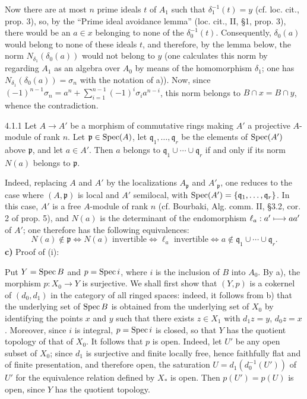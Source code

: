 Now there are at most $n$ prime ideals $t$ of $A_1$ such that $\delta_1^{-1}(t)=y$ (cf. loc. cit., prop. 3), so, by the ``Prime ideal avoidance lemma'' (loc. cit., II, §1, prop. 3), there would be an $a\in x$ belonging to none of the $\delta_0^{-1}(t)$. Consequently, $\delta_0(a)$ would belong to none of these ideals $t$, and therefore, by the lemma below, the norm $N_{\delta_1}(\delta_0(a))$ would not belong to $y$ (one calculates this norm by regarding $A_1$ as an algebra over $A_0$ by means of the homomorphism $\delta_1$; one has $N_{\delta_1}(\delta_0(a))=\sigma_n$ with the notation of a)). Now, since $(-1)^{n-1}\sigma_n=a^n+\sum_{i=1}^{n-1}(-1)^i\sigma_i a^{n-i}$, this norm belongs to $B\cap x=B\cap y$, whence the contradiction.
\begin{lemma}{4.1.1}\label{V.4.1.1}
Let $A\to A'$ be a morphism of commutative rings making $A'$ a projective $A$-module of rank $n$. Let $\mathfrak p\in\operatorname{Spec}(A)$, let $\mathfrak q_1,\ldots,\mathfrak q_r$ be the elements of $\operatorname{Spec}(A')$ above $\mathfrak p$, and let $a\in A'$. Then $a$ belongs to $\mathfrak q_1\cup\cdots\cup\mathfrak q_r$ if and only if its norm $N(a)$ belongs to $\mathfrak p$.
\end{lemma}
Indeed, replacing $A$ and $A'$ by the localizations $A_{\mathfrak p}$ and $A'_{\mathfrak p}$, one reduces to the case where $(A,\mathfrak p)$ is local and $A'$ semilocal, with $\operatorname{Spec}(A')=\{\mathfrak q_1,\ldots,\mathfrak q_r\}$.
In this case, $A'$ is a free $A$-module of rank $n$ (cf. Bourbaki, Alg. comm. II, §3.2, cor. 2 of prop. 5), and $N(a)$ is the determinant of the endomorphism $\ell_a:a'\longmapsto aa'$ of $A'$; one therefore has the following equivalences:
\[
N(a)\notin\mathfrak p\iff N(a)\text{ invertible}\iff\ell_a\text{ invertible}\iff a\notin\mathfrak q_1\cup\cdots\cup\mathfrak q_r.
\]
\textbf{c)} Proof of (i):

Put $Y=\operatorname{Spec} B$ and $p=\operatorname{Spec} i$, where $i$ is the inclusion of $B$ into $A_0$. By a), the morphism $p:X_0\to Y$ is surjective. We shall first show that $(Y,p)$ is a cokernel of $(d_0,d_1)$ in the category of all ringed spaces: indeed, it follows from b) that the underlying set of $\operatorname{Spec} B$ is obtained from the underlying set of $X_0$ by identifying the points $x$ and $y$ such that there exists $z\in X_1$ with $d_1z=y$, $d_0z=x$. Moreover, since $i$ is integral, $p=\operatorname{Spec} i$ is closed, so that $Y$ has the quotient topology of that of $X_0$. It follows that $p$ is open. Indeed, let $U'$ be any open subset of $X_0$; since $d_1$ is surjective and finite locally free, hence faithfully flat and of finite presentation, and therefore open, the saturation $U=d_1(d_0^{-1}(U'))$ of $U'$ for the equivalence relation defined by $X_*$ is open. Then $p(U')=p(U)$ is open, since $Y$ has the quotient topology.

